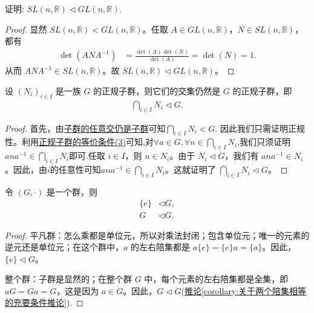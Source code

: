 \documentclass[../../main.tex]{subfiles}
\begin{document}
\begin{example}
证明: \(SL(n, \mathbb{R}) \lhd GL(n, \mathbb{R})\).
\end{example}
\begin{proof}
显然 \(SL(n, \mathbb{R}) < GL(n, \mathbb{R})\)。任取 \(A \in GL(n, \mathbb{R})\)，\(N \in SL(n, \mathbb{R})\)，都有
\begin{align*}
\det(ANA^{-1}) &= \frac{\det(A)\det(N)}{\det(A)} = \det(N) = 1.
\end{align*}
从而 \(ANA^{-1} \in SL(n, \mathbb{R})\)。故 \(SL(n, \mathbb{R}) \lhd GL(n, \mathbb{R})\)。 
\end{proof}

\begin{proposition}[正规子群的任意交还是正规子群]\label{正规子群的任意交还是正规子群}
设 $(N_i)_{i\in I}$ 是一族 $G$ 的正规子群，则它们的交集仍然是 $G$ 的正规子群，即
\begin{align*}
\bigcap_{i\in I}N_i\lhd G .
\end{align*}
\end{proposition}
\begin{proof}
首先，由\hyperref[proposition:子群的任意交仍是子群]{子群的任意交仍是子群}可知$\bigcap_{i\in I}N_i< G .$
因此我们只需证明正规性。利用\hyperref[lemma:正规子群的等价条件]{正规子群的等价条件(3)}可知,对$\forall a\in G,\forall n\in \bigcap_{i\in I}N_i$,我们只须证明$ana^{-1}\in \bigcap_{i\in I}N_i$即可.任取 $i\in I$，则 $n\in N_i$。由于 $N_i\lhd G$，我们有 $ana^{-1}\in N_i$。因此，由$i$的任意性可知$ana^{-1}\in \bigcap_{i\in I}N_i$。这就证明了 $\bigcap_{i\in I}N_i\lhd G$。
\end{proof}

\begin{proposition}\label{proposition:平凡群和整个群都是正规子群}
令 $(G,\cdot)$ 是一个群，则
\begin{align*}
\{e\}&\lhd G ,\\
G&\lhd G .
\end{align*}
\end{proposition}
\begin{proof}
平凡群：怎么乘都是单位元，所以对乘法封闭；包含单位元；唯一的元素的逆元还是单位元；在这个群中，$a$ 的左右陪集都是 $a\{e\}=\{e\}a = \{a\}$。因此，$\{e\}\lhd G$。

整个群：子群是显然的；在整个群 $G$ 中，每个元素的左右陪集都是全集，即 $aG = Ga = G$，这是因为 $a\in G$。因此，$G\lhd G$(\hyperref[corollary:关于两个陪集相等的充要条件推论]{推论\ref{corollary:关于两个陪集相等的充要条件推论}}).
\end{proof}
\end{document}
